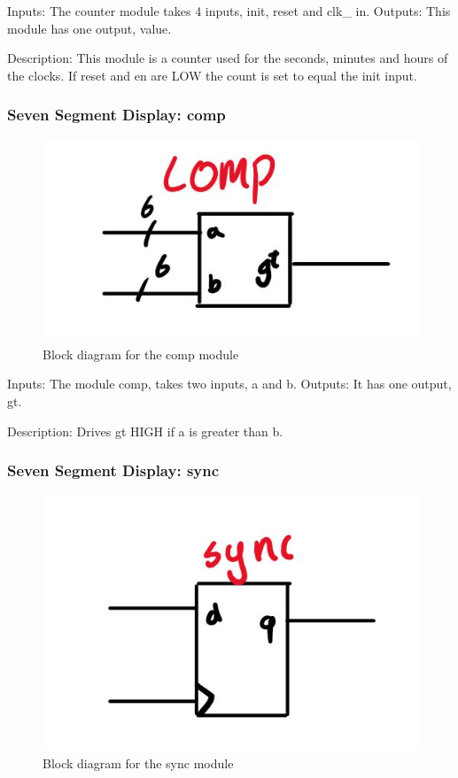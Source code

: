 \documentclass[a4paper]{article}
\begin{document}
Inputs: The counter module takes 4 inputs, init, reset and clk\_ in.
Outputs: This module has one output, value.

Description: This module is a counter used for the seconds, minutes and hours of the clocks. If reset and en are LOW the count is set to equal the init input.

\subsubsection{Seven Segment Display: comp}
\begin{figure}[H]
    \includegraphics[width=0.8 \linewidth]{images/comp.JPG}
    \caption{Block diagram for the comp module}
    \label{comp}
\end{figure}

Inputs: The module comp, takes two inputs, a and b.
Outputs: It has one output, gt.

Description: Drives gt HIGH if a is greater than b.

\subsubsection{Seven Segment Display: sync}
\begin{figure}[H]
    \includegraphics[width=0.8 \linewidth]{images/sync.JPG}
    \caption{Block diagram for the sync module}
    \label{sync}
\end{figure}
\end{document}
